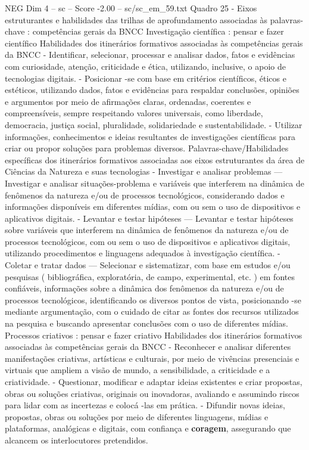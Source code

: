 \begin{textsample}{NEG Dim 4 – sc – Score -2.00 – sc/sc\_em\_59.txt}
Quadro 25 - Eixos estruturantes e habilidades das trilhas de aprofundamento associadas às palavras-chave : competências gerais da BNCC Investigação científica : pensar e fazer científico Habilidades dos itinerários formativos associadas às competências gerais da BNCC - Identificar, selecionar, processar e analisar dados, fatos e evidências com curiosidade, atenção, criticidade e ética, utilizando, inclusive, o apoio de tecnologias digitais. - Posicionar -se com base em critérios científicos, éticos e estéticos, utilizando dados, fatos e evidências para respaldar conclusões, opiniões e argumentos por meio de afirmações claras, ordenadas, coerentes e compreensíveis, sempre respeitando valores universais, como liberdade, democracia, justiça social, pluralidade, solidariedade e sustentabilidade. - Utilizar informações, conhecimentos e ideias resultantes de investigações científicas para criar ou propor soluções para problemas diversos.
Palavras-chave/Habilidades específicas dos itinerários formativos associadas aos eixos estruturantes da área de Ciências da Natureza e suas tecnologias - Investigar e analisar problemas — Investigar e analisar situações-problema e variáveis que interferem na dinâmica de fenômenos da natureza e/ou de processos tecnológicos, considerando dados e informações disponíveis em diferentes mídias, com ou sem o uso de dispositivos e aplicativos digitais. - Levantar e testar hipóteses — Levantar e testar hipóteses sobre variáveis que interferem na dinâmica de fenômenos da natureza e/ou de processos tecnológicos, com ou sem o uso de dispositivos e aplicativos digitais, utilizando procedimentos e linguagens adequados à investigação científica. - Coletar e tratar dados — Selecionar e sistematizar, com base em estudos e/ou pesquisas ( bibliográfica, exploratória, de campo, experimental, etc. ) em fontes confiáveis, informações sobre a dinâmica dos fenômenos da natureza e/ou de processos tecnológicos, identificando os diversos pontos de vista, posicionando -se mediante argumentação, com o cuidado de citar as fontes dos recursos utilizados na pesquisa e buscando apresentar conclusões com o uso de diferentes mídias.
Processos criativos : pensar e fazer criativo Habilidades dos itinerários formativos associadas às competências gerais da BNCC - Reconhecer e analisar diferentes manifestações criativas, artísticas e culturais, por meio de vivências presenciais e virtuais que ampliem a visão de mundo, a sensibilidade, a criticidade e a criatividade. - Questionar, modificar e adaptar ideias existentes e criar propostas, obras ou soluções criativas, originais ou inovadoras, avaliando e assumindo riscos para lidar com as incertezas e colocá -las em prática. - Difundir novas ideias, propostas, obras ou soluções por meio de diferentes linguagens, mídias e plataformas, analógicas e digitais, com confiança e \textbf{coragem}, assegurando que alcancem os interlocutores pretendidos.

\end{textsample}
